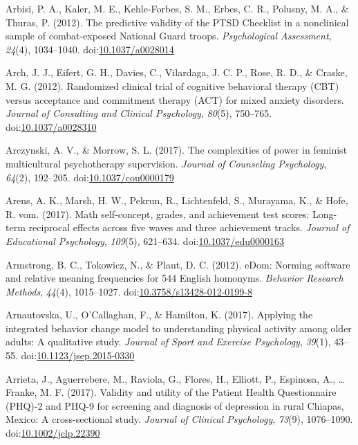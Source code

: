 \documentclass[english,man]{apa6}
\theoremstyle{definition}
\theoremstyle{definition}
\theoremstyle{definition}
\theoremstyle{remark}
\begin{document}
\hypertarget{ref-Arbisi2012}{}
Arbisi, P. A., Kaler, M. E., Kehle-Forbes, S. M., Erbes, C. R., Polusny,
M. A., \& Thuras, P. (2012). The predictive validity of the PTSD
Checklist in a nonclinical sample of combat-exposed National Guard
troops. \emph{Psychological Assessment}, \emph{24}(4), 1034--1040.
doi:\href{https://doi.org/10.1037/a0028014}{10.1037/a0028014}

\hypertarget{ref-Arch2012}{}
Arch, J. J., Eifert, G. H., Davies, C., Vilardaga, J. C. P., Rose, R.
D., \& Craske, M. G. (2012). Randomized clinical trial of cognitive
behavioral therapy (CBT) versus acceptance and commitment therapy (ACT)
for mixed anxiety disorders. \emph{Journal of Consulting and Clinical
Psychology}, \emph{80}(5), 750--765.
doi:\href{https://doi.org/10.1037/a0028310}{10.1037/a0028310}

\hypertarget{ref-Arczynski2017}{}
Arczynski, A. V., \& Morrow, S. L. (2017). The complexities of power in
feminist multicultural psychotherapy supervision. \emph{Journal of
Counseling Psychology}, \emph{64}(2), 192--205.
doi:\href{https://doi.org/10.1037/cou0000179}{10.1037/cou0000179}

\hypertarget{ref-Arens2017}{}
Arens, A. K., Marsh, H. W., Pekrun, R., Lichtenfeld, S., Murayama, K.,
\& Hofe, R. vom. (2017). Math self-concept, grades, and achievement test
scores: Long-term reciprocal effects across five waves and three
achievement tracks. \emph{Journal of Educational Psychology},
\emph{109}(5), 621--634.
doi:\href{https://doi.org/10.1037/edu0000163}{10.1037/edu0000163}

\hypertarget{ref-Armstrong2012}{}
Armstrong, B. C., Tokowicz, N., \& Plaut, D. C. (2012). eDom: Norming
software and relative meaning frequencies for 544 English homonyms.
\emph{Behavior Research Methods}, \emph{44}(4), 1015--1027.
doi:\href{https://doi.org/10.3758/s13428-012-0199-8}{10.3758/s13428-012-0199-8}

\hypertarget{ref-Arnautovska2017}{}
Arnautovska, U., O'Callaghan, F., \& Hamilton, K. (2017). Applying the
integrated behavior change model to understanding physical activity
among older adults: A qualitative study. \emph{Journal of Sport and
Exercise Psychology}, \emph{39}(1), 43--55.
doi:\href{https://doi.org/10.1123/jsep.2015-0330}{10.1123/jsep.2015-0330}

\hypertarget{ref-Arrieta2017}{}
Arrieta, J., Aguerrebere, M., Raviola, G., Flores, H., Elliott, P.,
Espinosa, A., \ldots{} Franke, M. F. (2017). Validity and utility of the
Patient Health Questionnaire (PHQ)-2 and PHQ-9 for screening and
diagnosis of depression in rural Chiapas, Mexico: A cross-sectional
study. \emph{Journal of Clinical Psychology}, \emph{73}(9), 1076--1090.
doi:\href{https://doi.org/10.1002/jclp.22390}{10.1002/jclp.22390}
\end{document}
